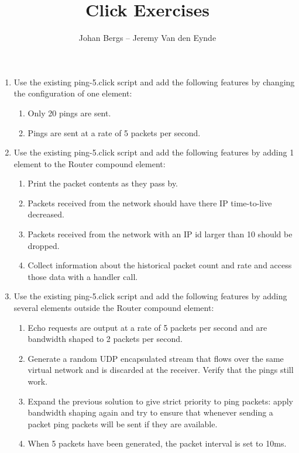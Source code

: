 \documentclass[a4paper]{article}
\author{Johan Bergs -- Jeremy Van den Eynde}
\date{}
\title{Click Exercises}
\begin{document}
\maketitle

\begin{enumerate}

\item Use the existing ping-5.click script and add the following features by changing the configuration of one element:

\begin{enumerate}
\item Only 20 pings are sent.
\item Pings are sent at a rate of 5 packets per second.
\end{enumerate}


\item Use the existing ping-5.click script and add the following features by adding 1 element to the Router compound element:

\begin{enumerate}
\item Print the packet contents as they pass by.
\item Packets received from the network should have there IP time-to-live decreased.
\item Packets received from the network with an IP id larger than 10 should be dropped.
\item Collect information about the historical packet count and rate and access those data with a handler call.
\end{enumerate}

\item Use the existing ping-5.click script and add the following features by adding several elements outside the Router compound element:

\begin{enumerate}
\item Echo requests are output at a rate of 5 packets per second and are bandwidth shaped to 2 packets per second.
\item Generate a random UDP encapsulated stream that flows over the same virtual network and is discarded at the receiver. Verify that the pings still work.
\item Expand the previous solution to give strict priority to ping packets: apply bandwidth shaping again and try to ensure that whenever sending a packet ping packets will be sent if they are available.
\item When 5 packets have been generated, the packet interval is set to 10ms.
\end{enumerate}


\end{enumerate}
\end{document}
